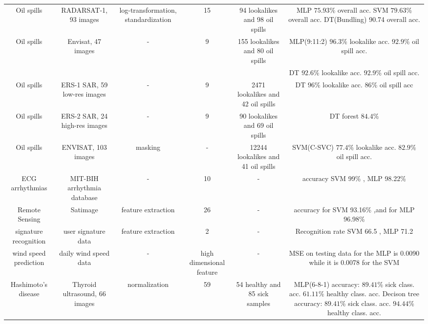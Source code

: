 \begin{table*}[t]
{\begin{tabular}{*{6}{c}}
    Oil spills\cite{Xu201414} &  RADARSAT-1, 93 images & log-transformation, standardization & 15 & 94 lookalikes and 98 oil spills & MLP $75.93$\% overall acc. SVM $79.63$\% overall acc. DT(Bundling) 90.74 overall acc.\\
    
    Oil spills\cite{Mera201472} &  Envisat, 47 images & - & 9 & 155 lookalikes and 80 oil spills & MLP(9:11:2) $96.3$\% lookalike acc. $92.9$\% oil spill acc. \\
    & & & & & DT $92.6$\% lookalike acc. $92.9$\% oil spill acc. \\
    
    Oil spills\cite{Delfrate1996} &  ERS-1 SAR, 59 low-res images & - & 9 & 2471 lookalikes and 42 oil spills & DT $96$\% lookalike acc. $86$\% oil spill acc\\
    
    Oil spills\cite{Topouzelis201268} &  ERS-2 SAR, 24 high-res images & - & 9 & 90 lookalikes and 69 oil spills & DT forest $84.4$\%\\ 
    
    Oil spills\cite{brekke2008classifiers} & ENVISAT, 103 images & masking & - & 12244 lookalikes and 41 oil spills & SVM(C-SVC) $77.4$\% lookalike acc. $82.9$\% oil spill acc.\\

    ECG arrhythmias\cite{Moavenian20103088} & MIT-BIH arrhythmia database & - & 10 & - & accuracy SVM 99\% , MLP 98.22\% \\

    Remote Sensing\cite{Zanaty2012177} & Satimage & feature extraction & 26& - & accuracy for SVM 93.16\% ,and for MLP 96.98\%\\
    
    signature recognition\cite{FriasMartinez2006693} & user signature data &feature extraction& 2 & - & Recognition rate SVM 66.5  , MLP 71.2\\
    wind speed prediction\cite{Mohandes2004939}& daily wind speed data & - &high dimensional feature & - & MSE on testing data for the MLP is 0.0090 while it is 0.0078 for the SVM\\
    
    Hashimoto's disease\cite{Omiotek201340} &  Thyroid ultrasound, 66 images & normalization & 59 & 54 healthy and 85 sick samples & MLP(6-8-1) accuracy: $89.41$\% sick class. acc. $61.11$\% healthy class. acc. Decison tree accuracy: $89.41$\% sick class. acc. $94.44$\% healthy class. acc. \\
    
    
\end{tabular}
}
\end{table*}

